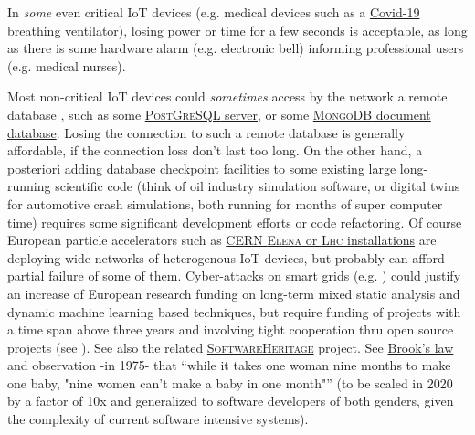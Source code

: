  In \emph{some} even critical IoT devices (e.g. medical devices
  such  as a \href{https://github.com/Recovid/}{Covid-19 breathing
   ventilator}), losing power or time for a few seconds is acceptable,
 as long as there is some hardware alarm (e.g. electronic bell)
 informing professional users (e.g. medical nurses).

 Most non-critical IoT devices could \emph{sometimes} access by the
 network a remote database  ,
 such as some \href{https://www.postgresql.org/}{\textsc{PostGreSQL}
   server}, or some \href{https://www.mongodb.com/}{\textsc{MongoDB}
   document database}. Losing the connection to such a remote database
 is generally affordable, if the connection loss don't last too
 long. On the other hand, a posteriori adding database checkpoint
     
  
   facilities to some
 existing large long-running scientific code (think of oil industry
 simulation software, or digital twins for automotive crash
   simulations, both
 running for months of super computer time) requires some significant
 development efforts or code refactoring. Of course European particle
 accelerators such as
 \href{https://home.cern/science/accelerators/}{CERN \textsc{Elena} or
   \textsc{Lhc} installations} are deploying wide networks of
 heterogenous IoT devices, but probably can afford partial failure of
 some of them. Cyber-attacks on smart grids
 (e.g. \cite{lee:2016:analysis-cyberattack}) could justify an increase
 of European research funding on long-term mixed static analysis and
 dynamic machine learning based techniques, but require funding of
 projects with a time span above three years and involving tight
 cooperation thru open source projects (see \cite{Brooks:1995:MM,
   Lerner-Tirole:2000:economics-open-source,
   Tirole:2018:eco-bien-commun, hashem:2015:rise}). See also the related
 \href{https://www.softwareheritage.org/}{\textsc{SoftwareHeritage}}
 project. See
 \href{https://en.wikipedia.org/wiki/Brooks's_law}{Brook's law} and
 observation -in 1975- that ``while it takes one woman nine months to
 make one baby, "nine women can't make a baby in one month"'' (to be
 scaled in 2020 by a factor of 10x and generalized to software
 developers of both genders, given the complexity of current software
 intensive systems).

